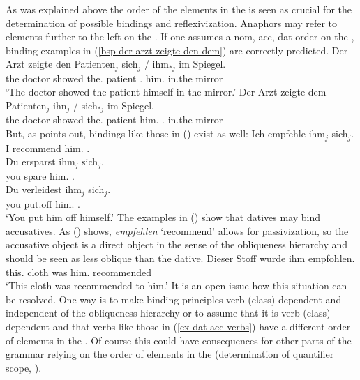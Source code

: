 \documentclass[output=paper
	        ,collection
	        ,collectionchapter
 	        ,biblatex
                ,babelshorthands
                ,newtxmath
                ,draftmode
                ,colorlinks, citecolor=brown
]{langscibook}
\begin{document}
{As was explained above the order of the elements in the \argstl is seen as crucial for the
determination of possible bindings and reflexivization. Anaphors may refer to elements further to
the left on the \argstl. If one assumes a nom, acc, dat order on the \argstl, 
binding examples in (\ref{bsp-der-arzt-zeigte-den-dem}) are correctly predicted.
\eal
\label{bsp-der-arzt-zeigte-den-dem}
\ex
\label{bsp-der-arzt-zeigte-den} 
\gll Der Arzt   zeigte den        Patienten$_j$ sich$_j$ / ihm$_{*j}$ im Spiegel.\\
     the doctor showed the.\acc{} patient       \self.\dat{}    {} him.\dat{}       in.the mirror\\
\glt `The doctor showed the patient himself in the mirror.'
\ex
\label{bsp-der-arzt-zeigte-dem} 
\gll Der Arzt zeigte dem Patienten$_j$ ihn$_j$ / sich$_{*j}$ im Spiegel.\\
     the doctor showed the.\dat{} patient     him.\acc{}    {} \self.\acc{}       in.the mirror\\
\zl
But, as \citet[]{Eisenberg86} points out, bindings like those in () exist as well:
\eal
\label{ex-dat-acc-verbs}
\ex 
\gll Ich empfehle ihm$_j$ sich$_j$.\\
     I   recommend him.\dat{} \self.\acc\\ 
\ex 
\gll Du ersparst ihm$_j$ sich$_j$.\\
     you spare him.\dat{}  \self.\acc\\
\ex 
\gll Du verleidest ihm$_j$ sich$_j$.\\
     you put.off him.\dat{}  \self.\acc\\
\glt `You put him off himself.'
\zl
The examples in () show that datives may bind accusatives. As () shows,
\emph{empfehlen} `recommend' allows for passivization, so the accusative object is a direct object in
the sense of the obliqueness hierarchy and should be seen as less oblique than the dative.
\ea
\gll Dieser Stoff wurde ihm empfohlen.\\
     this.\nom{} cloth was him.\dat{} recommended\\
\glt `This cloth was recommended to him.'
\z
It is an open issue how this situation can be resolved. One way is to make binding principles verb
(class) dependent and independent of the obliqueness hierarchy or to assume that it is verb (class)
dependent and that verbs like those in (\ref{ex-dat-acc-verbs}) have a different order of elements
in the \argstl. Of course this could have consequences for other parts of the grammar relying on the
order of elements in the \argstl (\eg determination of quantifier scope, \citealp{Kiss2001a}).

}
\end{document}
